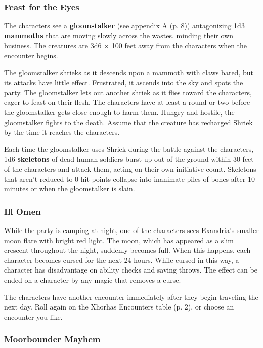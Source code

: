 \documentclass[letterpaper, 11pt, bg=full, twocolumn]{dndbook}
\begin{document}
\subsubsection{Feast for the Eyes}

The characters see a \textbf{gloomstalker} (see appendix A (p. 8)) antagonizing 1d3 \textbf{mammoths} that are moving slowly across the wastes, minding their own business. The creatures are 3d6 × 100 feet away from the characters when the encounter begins.

The gloomstalker shrieks as it descends upon a mammoth with claws bared, but its attacks have little effect. Frustrated, it ascends into the sky and spots the party. The gloomstalker lets out another shriek as it flies toward the characters, eager to feast on their flesh. The characters have at least a round or two before the gloomstalker gets close enough to harm them. Hungry and hostile, the gloomstalker fights to the death. Assume that the creature has recharged Shriek by the time it reaches the characters.

Each time the gloomstalker uses Shriek during the battle against the characters, 1d6 \textbf{skeletons} of dead human soldiers burst up out of the ground within 30 feet of the characters and attack them, acting on their own initiative count. Skeletons that aren't reduced to 0 hit points collapse into inanimate piles of bones after 10 minutes or when the gloomstalker is slain.

\subsubsection{Ill Omen}

While the party is camping at night, one of the characters sees Exandria's smaller moon flare with bright red light. The moon, which has appeared as a slim crescent throughout the night, suddenly becomes full. When this happens, each character becomes cursed for the next 24 hours. While cursed in this way, a character has disadvantage on ability checks and saving throws. The effect can be ended on a character by any magic that removes a curse.

The characters have another encounter immediately after they begin traveling the next day. Roll again on the Xhorhas Encounters table (p. 2), or choose an encounter you like.

\subsubsection{Moorbounder Mayhem}
\end{document}

